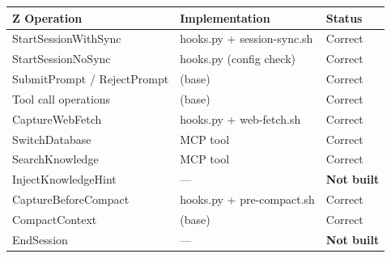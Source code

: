\documentclass[a4paper,10pt,fleqn]{article}
\begin{document}
\begin{tabular}{lll}
\hline
\textbf{Z Operation} & \textbf{Implementation} & \textbf{Status} \\
\hline
StartSessionWithSync & hooks.py + session-sync.sh & Correct \\
StartSessionNoSync & hooks.py (config check) & Correct \\
SubmitPrompt / RejectPrompt & (base) & Correct \\
Tool call operations & (base) & Correct \\
CaptureWebFetch & hooks.py + web-fetch.sh & Correct \\
SwitchDatabase & MCP tool & Correct \\
SearchKnowledge & MCP tool & Correct \\
InjectKnowledgeHint & --- & \textbf{Not built} \\
CaptureBeforeCompact & hooks.py + pre-compact.sh & Correct \\
CompactContext & (base) & Correct \\
EndSession & --- & \textbf{Not built} \\
\hline
\end{tabular}
\end{document}
